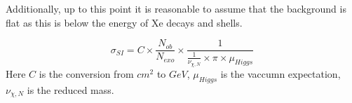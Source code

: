 \par
Additionally, up to this point it is reasonable to assume that the background is flat as this is below the energy of Xe decays and shells.



\begin{equation}
    \sigma_{SI} = C \times \frac{N_{ob}}{N_{exo}} \times \frac{1}{\frac{1}{\nu_{\chi,N}} \times \pi \times \mu_{Higgs}}
\end{equation}
Here $C$ is the conversion from $cm^{2}$ to $GeV$, $\mu_{Higgs}$ is the vaccumn expectation, $\nu_{\chi,N}$ is the reduced mass.